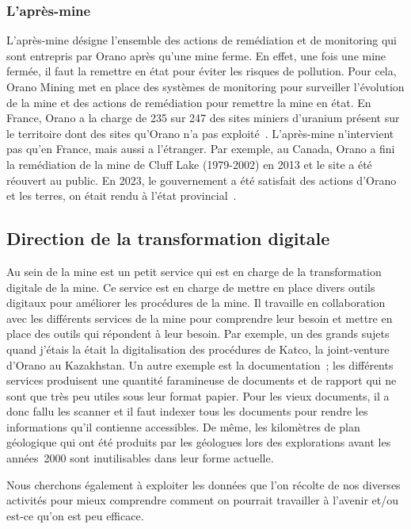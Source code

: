\subsubsection{L'après-mine}
L'après-mine désigne l'ensemble des actions de remédiation et de monitoring qui sont entrepris par Orano après qu'une mine ferme. En effet, une fois une mine fermée, il faut la remettre en état pour éviter les risques de pollution. Pour cela, Orano Mining met en place des systèmes de monitoring pour surveiller l'évolution de la mine et des actions de remédiation pour remettre la mine en état. En France, Orano a la charge de 235 sur 247 des sites miniers d'uranium présent sur le territoire dont des sites qu'Orano n'a pas exploité~\cite{site:orano_apres_mine}. L'après-mine n'intervient pas qu'en France, mais aussi a l'étranger. Par exemple, au Canada, Orano a fini la remédiation de la mine de Cluff Lake (1979-2002) en 2013 et le site a été réouvert au public. En 2023, le gouvernement a été satisfait des actions d'Orano et les terres, on était rendu à l'état provincial~\cite{site:Cluff_lake_remediation}.

\subsection{Direction de la transformation digitale}
Au sein de la mine est un petit service qui est en charge de la transformation digitale de la mine. Ce service est en charge de mettre en place divers outils digitaux pour améliorer les procédures de la mine. Il travaille en collaboration avec les différents services de la mine pour comprendre leur besoin et mettre en place des outils qui répondent à leur besoin. Par exemple, un des grands sujets quand j'étais la était la digitalisation des procédures de Katco, la joint-venture d'Orano au Kazakhstan. Un autre exemple est la documentation~; les différents services produisent une quantité faramineuse de documents et de rapport qui ne sont que très peu utiles sous leur format papier. Pour les vieux documents, il a donc fallu les scanner et il faut indexer tous les documents pour rendre les informations qu'il contienne accessibles. De même, les kilomètres de plan géologique qui ont été produits par les géologues lors des explorations avant les années~2000 sont inutilisables dans leur forme actuelle.

Nous cherchons également à exploiter les données que l'on récolte de nos diverses activités pour mieux comprendre comment on pourrait travailler à l'avenir et/ou est-ce qu’on est peu efficace.

